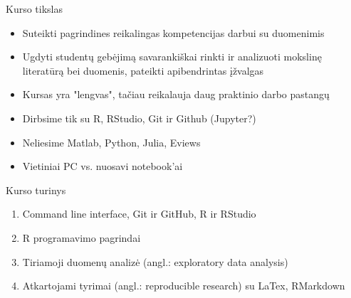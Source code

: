\documentclass[11pt,xcolor=table]{beamer}
\begin{document}


\begin{frame}{Kurso tikslas}
\begin{itemize}
\item Suteikti pagrindines reikalingas kompetencijas darbui su duomenimis
\item Ugdyti studentų gebėjimą savarankiškai rinkti ir analizuoti mokslinę literatūrą bei duomenis, pateikti apibendrintas įžvalgas
\item Kursas yra "lengvas", tačiau reikalauja daug praktinio darbo pastangų
\item Dirbsime tik su R, RStudio, Git ir Github (Jupyter?)
\item Neliesime Matlab, Python, Julia, Eviews
\item Vietiniai PC vs. nuosavi notebook'ai
\end{itemize}
\end{frame}



\begin{frame}{Kurso turinys}
\begin{enumerate}
\item Command line interface,  Git ir GitHub, R ir RStudio
\item R programavimo pagrindai
\item Tiriamoji duomenų analizė (angl.: exploratory data analysis)
\item Atkartojami tyrimai (angl.: reproducible research) su LaTex, RMarkdown
\end{enumerate}
\end{frame}
\end{document}
